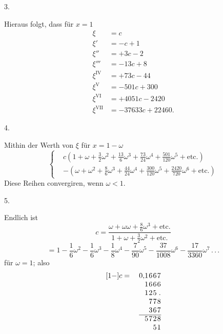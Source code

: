 \clearpage{}
\begingroup
\makeatletter\tagsleft@true\let\veqno\@@leqno\makeatother
\begin{center}3.\end{center}
\noindent\hspace*{\parindent}Hieraus folgt, dass für \(x=1\)
\[
\begin{aligned}
\xi&=c\\
\xi'&=-c+1\\
\xi''&=+3c-2\\
\xi'''&=-13c+8\\
\xi^{\mathrm{IV}}&=+73c-44\\
\xi^{\mathrm{V}}&=-501c+300\\
\xi^{\mathrm{VI}}&=+4051c-2420\\
\xi^{\mathrm{VII}}&=-37633c+22460.
\end{aligned}
\]
\begin{center}4.\end{center}
\noindent\hspace*{\parindent}Mithin der Werth von \(\xi\) für \(x=1-\omega\)
\begin{equation}
\left\{\begin{aligned}
&c\left(1+\omega+\frac32\omega^2+\frac{13}{6}\omega^3+\frac{73}{24}\omega^4+\frac{501}{120}\omega^5+\text{etc.}\right)\\[.5em]
&-\left(\omega+\omega^2+\frac86\omega^3+\frac{44}{24}\omega^4+\frac{300}{120}\omega^5+\frac{2420}{720}\omega^6+\text{etc.}\right)
\end{aligned}\right.\tag*{[3]}
\end{equation}
\noindent Diese Reihen convergiren, wenn \(\omega<1\).
\begin{center}5.\end{center}
\noindent\hspace*{\parindent}Endlich ist
\begin{equation}
c=\frac{\omega+\omega\omega+\frac86\omega^3+\text{etc.}}{1+\omega+\frac32\omega^2+\text{etc.}}\tag*{[4]}
\end{equation}
\begin{equation}
{}=1-\frac16\omega^2-\frac16\omega^3-\frac18\omega^4-\frac7{90}\omega^5-\frac{37}{1008}\omega^6-\frac{17}{3360}\omega^7\,{.}\,{.}\,{.}\tag*{[5]}
\end{equation}
\noindent für \(\omega=1\); also
\[
\setlength{\arraycolsep}{.4pt}
\begin{array}{r@{\quad}r@{}rrrr}
[1-]c={}&0{,}&1&6&6&7\\
&&1&6&6&6\\
&&1&2&5&{.}\\
&&&7&7&8\\
&&&3&6&7\\ \cline{2-6}
&&5&7&2&8\\
&&&&5&1
\end{array}
\]
